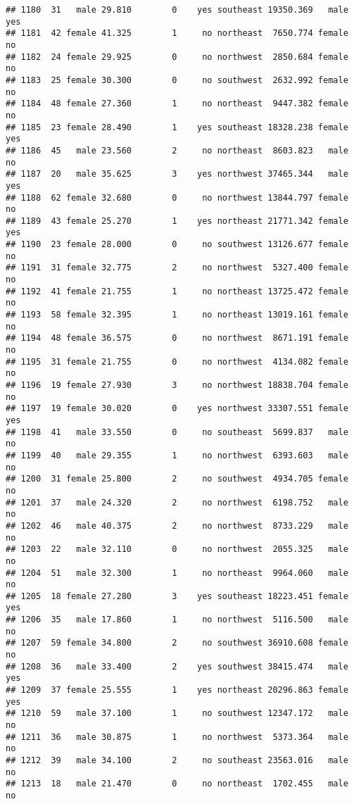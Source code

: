 \documentclass[
]{article}
\begin{document}
\begin{verbatim}
## 1180  31   male 29.810        0    yes southeast 19350.369   male      yes
## 1181  42 female 41.325        1     no northeast  7650.774 female       no
## 1182  24 female 29.925        0     no northwest  2850.684 female       no
## 1183  25 female 30.300        0     no southwest  2632.992 female       no
## 1184  48 female 27.360        1     no northeast  9447.382 female       no
## 1185  23 female 28.490        1    yes southeast 18328.238 female      yes
## 1186  45   male 23.560        2     no northeast  8603.823   male       no
## 1187  20   male 35.625        3    yes northwest 37465.344   male      yes
## 1188  62 female 32.680        0     no northwest 13844.797 female       no
## 1189  43 female 25.270        1    yes northeast 21771.342 female      yes
## 1190  23 female 28.000        0     no southwest 13126.677 female       no
## 1191  31 female 32.775        2     no northwest  5327.400 female       no
## 1192  41 female 21.755        1     no northeast 13725.472 female       no
## 1193  58 female 32.395        1     no northeast 13019.161 female       no
## 1194  48 female 36.575        0     no northwest  8671.191 female       no
## 1195  31 female 21.755        0     no northwest  4134.082 female       no
## 1196  19 female 27.930        3     no northwest 18838.704 female       no
## 1197  19 female 30.020        0    yes northwest 33307.551 female      yes
## 1198  41   male 33.550        0     no southeast  5699.837   male       no
## 1199  40   male 29.355        1     no northwest  6393.603   male       no
## 1200  31 female 25.800        2     no southwest  4934.705 female       no
## 1201  37   male 24.320        2     no northwest  6198.752   male       no
## 1202  46   male 40.375        2     no northwest  8733.229   male       no
## 1203  22   male 32.110        0     no northwest  2055.325   male       no
## 1204  51   male 32.300        1     no northeast  9964.060   male       no
## 1205  18 female 27.280        3    yes southeast 18223.451 female      yes
## 1206  35   male 17.860        1     no northwest  5116.500   male       no
## 1207  59 female 34.800        2     no southwest 36910.608 female       no
## 1208  36   male 33.400        2    yes southwest 38415.474   male      yes
## 1209  37 female 25.555        1    yes northeast 20296.863 female      yes
## 1210  59   male 37.100        1     no southwest 12347.172   male       no
## 1211  36   male 30.875        1     no northwest  5373.364   male       no
## 1212  39   male 34.100        2     no southeast 23563.016   male       no
## 1213  18   male 21.470        0     no northeast  1702.455   male       no

\end{verbatim}
\end{document}
